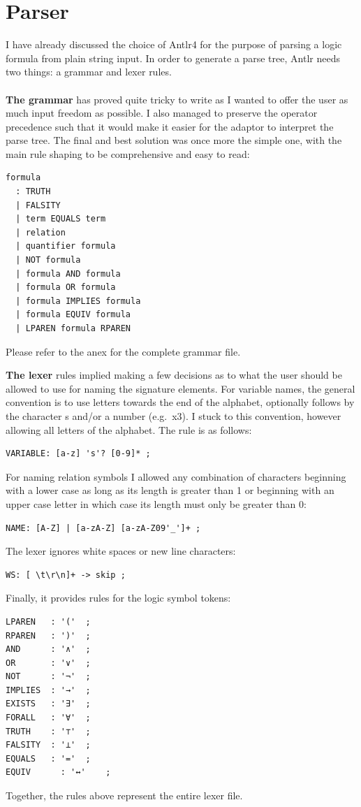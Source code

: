 \documentclass{report}
\begin{document}
\section{Parser}
I have already discussed the choice of Antlr4 for the purpose of parsing a logic formula from plain string input. In order to generate a parse tree, Antlr needs two things: a grammar and lexer rules. \\ \\
\textbf{The grammar} has proved quite tricky to write as I wanted to offer the user as much input freedom as possible. I also managed to preserve the operator precedence such that it would make it easier for the adaptor to interpret the parse tree. The final and best solution was once more the simple one, with the main rule shaping to be comprehensive and easy to read:
\begin{verbatim}
formula
  : TRUTH
  | FALSITY
  | term EQUALS term
  | relation
  | quantifier formula
  | NOT formula
  | formula AND formula
  | formula OR formula 
  | formula IMPLIES formula
  | formula EQUIV formula 
  | LPAREN formula RPAREN
\end{verbatim}
Please refer to the anex for the complete grammar file.

\textbf{The lexer} rules implied making a few decisions as to what the user should be allowed to use for naming the signature elements. For variable names, the general convention is to use letters towards the end of the alphabet, optionally follows by the character s and/or a number (e.g.\ x3). I stuck to this convention, however allowing all letters of the alphabet. The rule is as follows:
\begin{verbatim}
VARIABLE: [a-z] 's'? [0-9]* ;
\end{verbatim}
For naming relation symbols I allowed any combination of characters beginning with a lower case as long as its length is greater than 1 or beginning with an upper case letter in which case its length must only be greater than 0:
\begin{verbatim}
NAME: [A-Z] | [a-zA-Z] [a-zA-Z09'_']+ ;
\end{verbatim}
The lexer ignores white spaces or new line characters:
\begin{verbatim}
WS: [ \t\r\n]+ -> skip ;
\end{verbatim}
Finally, it provides rules for the logic symbol tokens:
\begin{verbatim}
LPAREN   : '('	;
RPAREN   : ')'	; 
AND      : '∧'	;
OR       : '∨'	;
NOT      : '¬'	;
IMPLIES  : '→'	;
EXISTS	 : '∃'	;
FORALL	 : '∀'	;
TRUTH    : '⊤'	;
FALSITY  : '⊥'	;
EQUALS	 : '='	;
EQUIV	   : '↔'	;
\end{verbatim}
Together, the rules above represent the entire lexer file.
\end{document}
